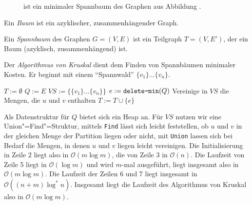 \begin{figure}[htb]
  \centering
  \hspace{.05\textwidth}
  \caption{ ist ein minimaler Spannbaum des Graphen aus Abbildung .}
  \label{kap4MST}
\end{figure}

\begin{Def}[Baum]
\hspace{\parindent}Ein \textit{Baum} ist ein azyklischer, zusammenhängender Graph.
\end{Def}

\begin{Def}[Spannbaum]
\hspace{\parindent}Ein \textit{Spannbaum} des Graphen $G=(V,E)$ ist ein Teilgraph $T=(V, E')$, der ein Baum (azyklisch, zusammenhängend) ist.
\end{Def}

Der \textit{Algorithmus von Kruskal} dient dem Finden von Spannbäumen minimaler Kosten. Er beginnt mit einem "`Spannwald"' $\{v_1\} \ldots \{v_n\}$.

\begin{Alg}
\begin{algorithmic}[1]
  \State $T := \emptyset$
  \State $Q := E$ 
  \State $VS := \{ \{v_1\} \ldots \{v_n\} \}$ 
    \State $e:=\text{\texttt{delete-min}}(Q)$
      \State Vereinige in $VS$ die Mengen, die $u$ und $v$  enthalten
      \State $T := T \cup \{ e \}$
    \EndIf
  \EndWhile
\end{algorithmic}
\end{Alg}

Als Datenstruktur für $Q$ bietet sich ein Heap an. Für $VS$ nutzen wir eine Union"=Find"=Struktur, mittels \texttt{Find} lässt sich leicht feststellen, ob $u$ und $v$ in der gleichen Menge der Partition liegen oder nicht, mit \texttt{Union} lassen sich bei Bedarf die Mengen, in denen $u$ und $v$ liegen leicht vereinigen. Die Initialisierung in Zeile $2$ liegt also in $\mathcal{O}(m \log m)$, die von Zeile $3$ in $\mathcal{O}(n)$. Die Laufzeit von Zeile 5 liegt in $\mathcal{O}(\log m)$ und wird $m$-mal ausgeführt, liegt insgesamt also in $\mathcal{O}(m \log m)$. Die Laufzeit der Zeilen 6 und 7 liegt insgesamt in $\mathcal{O}((n+m) \log^{*}n)$. Insgesamt liegt die Laufzeit des Algorithmus von Kruskal also in $\mathcal{O}(m \log m)$.

